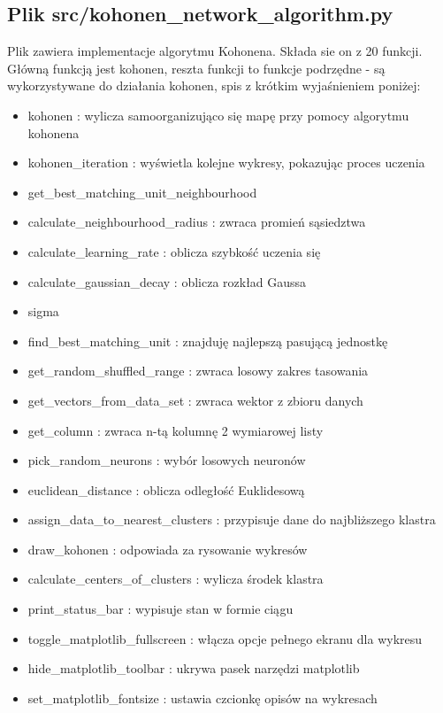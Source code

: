 \documentclass{classrep}
\begin{document}
{\subsection{Plik src/kohonen\_network\_algorithm.py}
{
Plik zawiera implementacje algorytmu Kohonena. Składa sie on z 20 funkcji. Główną funkcją jest kohonen, reszta
funkcji to funkcje podrzędne - są wykorzystywane do działania kohonen, spis z krótkim wyjaśnieniem poniżej:
\begin{itemize}
\item kohonen : wylicza samoorganizująco się mapę przy pomocy algorytmu kohonena
\item kohonen\_iteration : wyświetla kolejne wykresy, pokazując proces uczenia
\item get\_best\_matching\_unit\_neighbourhood
\item calculate\_neighbourhood\_radius : zwraca promień sąsiedztwa
\item calculate\_learning\_rate : oblicza szybkość uczenia się
\item calculate\_gaussian\_decay : oblicza rozkład Gaussa
\item sigma
\item find\_best\_matching\_unit : znajduję najlepszą pasującą jednostkę
\item get\_random\_shuffled\_range : zwraca losowy zakres tasowania
\item get\_vectors\_from\_data\_set : zwraca wektor z zbioru danych
\item get\_column : zwraca n-tą kolumnę 2 wymiarowej listy
\item pick\_random\_neurons : wybór losowych neuronów
\item euclidean\_distance : oblicza odległość Euklidesową
\item assign\_data\_to\_nearest\_clusters : przypisuje dane do najbliższego klastra
\item draw\_kohonen : odpowiada za rysowanie wykresów
\item calculate\_centers\_of\_clusters : wylicza środek klastra
\item print\_status\_bar : wypisuje stan w formie ciągu
\item toggle\_matplotlib\_fullscreen : włącza opcje pełnego ekranu dla wykresu
\item hide\_matplotlib\_toolbar : ukrywa pasek narzędzi matplotlib
\item set\_matplotlib\_fontsize : ustawia czcionkę opisów na wykresach
\end{itemize}
}

}
\end{document}
